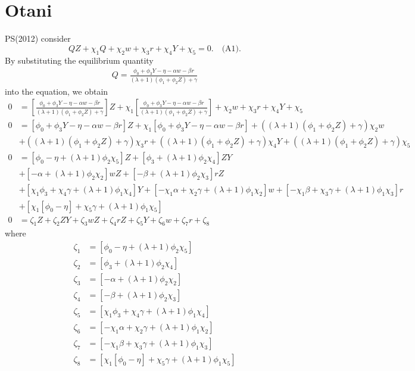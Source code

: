 \documentclass[11pt, a4paper]{article}
\begin{document}
\section{Otani}


PS(2012) consider
\[QZ + \chi_1 Q + \chi_2 w + \chi_3 r + \chi_4 Y + \chi_5 = 0.\quad \text{(A1)}.\]
By substituting the equilibrium quantity
\begin{align*}
    Q = \frac{\phi_0 + \phi_3Y -\eta - \alpha w -  \beta r}{(\lambda + 1) (\phi_1 + \phi_2 Z) + \gamma}
\end{align*}
into the equation, we obtain
\begin{align*}
    0&=[\frac{\phi_0 + \phi_3Y -\eta - \alpha w -  \beta r}{(\lambda + 1) (\phi_1 + \phi_2 Z) + \gamma}]Z + \chi_1 [\frac{\phi_0 + \phi_3Y -\eta - \alpha w -  \beta r}{(\lambda + 1) (\phi_1 + \phi_2 Z) + \gamma}] + \chi_2 w + \chi_3 r + \chi_4 Y + \chi_5\nonumber\\
    0&=[\phi_0 + \phi_3Y -\eta - \alpha w -  \beta r]Z + \chi_1 [\phi_0 + \phi_3Y -\eta - \alpha w -  \beta r] 
    + ((\lambda + 1) (\phi_1 + \phi_2 Z) + \gamma)\chi_2 w \\
    &+ ((\lambda + 1) (\phi_1 + \phi_2 Z) + \gamma)\chi_3 r + ((\lambda + 1) (\phi_1 + \phi_2 Z) + \gamma)\chi_4 Y + ((\lambda + 1) (\phi_1 + \phi_2 Z) + \gamma)\chi_5\nonumber\\
    0&=[\phi_0-\eta+(\lambda + 1)\phi_2 \chi_5]Z+[\phi_3+(\lambda + 1)\phi_2 \chi_4]ZY\\
    &+[-\alpha+(\lambda + 1)\phi_2 \chi_2]wZ + [-\beta+(\lambda + 1)\phi_2  \chi_3]rZ \\
    &+[\chi_1 \phi_3+\chi_4\gamma+(\lambda+1)\phi_1 \chi_4]Y+ [-\chi_1\alpha+\chi_2\gamma +(\lambda+1)\phi_1 \chi_2]w+[-\chi_1\beta+\chi_3 \gamma+(\lambda+1)\phi_1 \chi_3] r \\
    &+[\chi_1 [\phi_0 -\eta]+\chi_5\gamma+(\lambda+1)\phi_1 \chi_5]\nonumber\\
    0&=\zeta_1 Z + \zeta_2 ZY + \zeta_3 wZ + \zeta_4 rZ + \zeta_5 Y + \zeta_6 w + \zeta_7 r + \zeta_8 
\end{align*}
where
\begin{align*}
    \zeta_1 &= [\phi_0-\eta+(\lambda + 1)\phi_2 \chi_5]\\
    \zeta_2 &= [\phi_3+(\lambda + 1)\phi_2 \chi_4]\\
    \zeta_3 &= [-\alpha+(\lambda + 1)\phi_2 \chi_2]\\
    \zeta_4 &= [-\beta+(\lambda + 1)\phi_2  \chi_3]\\
    \zeta_5 &= [\chi_1 \phi_3+\chi_4\gamma+(\lambda+1)\phi_1 \chi_4]\\
    \zeta_6 &= [-\chi_1\alpha+\chi_2\gamma+(\lambda+1)\phi_1 \chi_2 ]\\
    \zeta_7 &= [-\chi_1\beta+\chi_3 \gamma+(\lambda+1)\phi_1 \chi_3]\\
    \zeta_8 &= [\chi_1 [\phi_0 -\eta]+\chi_5\gamma+(\lambda+1)\phi_1 \chi_5]
\end{align*}
\end{document}
